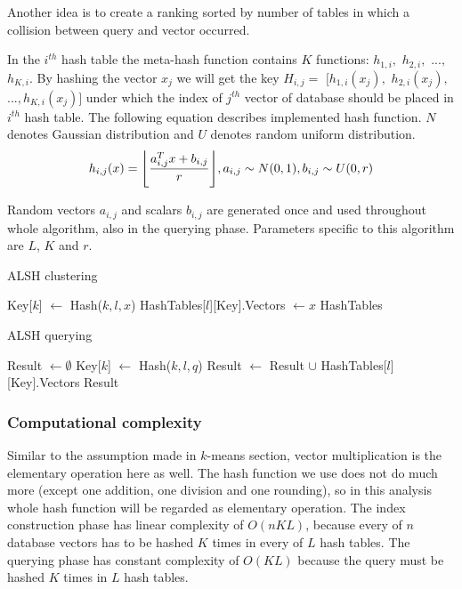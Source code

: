 Another idea is to create a ranking sorted by number of tables in which a collision
between query and vector occurred.
\par
In the $i^{th}$ hash table the meta-hash function contains $K$ functions: $h_{1,i},$ $h_{2,i},$ $...,$ $h_{K,i}$.
By hashing the vector $x_j$ we will get the key $H_{i,j} = $ $[h_{1,i}(x_j),$ $h_{2,i}(x_j),$
$..., h_{K,i}(x_j)]$ under which the index of $j^{th}$ vector of database should be
placed in $i^{th}$ hash table. The following equation describes implemented hash function.
$N$ denotes Gaussian distribution and $U$ denotes random uniform distribution.
\begin{equation*}
h_{i,j}(x) = \floor*{\frac{a_{i,j}^T x + b_{i,j}}{r}}, a_{i,j} \sim N(0,1), b_{i,j} \sim U(0,r)
\end{equation*}
\par
Random vectors $a_{i,j}$ and scalars $b_{i,j}$ are generated once and used throughout whole
algorithm, also in the querying phase. Parameters specific to this algorithm are $L$, $K$ and $r$.

\begin{algorithm}
	\caption{ALSH clustering}
	\begin{algorithmic}
				\State Key[$k$] $\gets$ Hash($k, l, x$)
			\EndFor
			\State HashTables[$l$][Key].Vectors $\gets x$
		\EndFor
		\State \Return HashTables
	\end{algorithmic}
\end{algorithm}

\begin{algorithm}
	\caption{ALSH querying}
	\begin{algorithmic}
		\State Result $\gets \emptyset$
		\For{$l = 0, 1, ..., L$}
			\For{$k = 0, 1, ..., K$}
				\State Key[$k$] $\gets$ Hash($k, l, q$)
			\EndFor
			\State Result $\gets$ Result $\cup$ HashTables[$l$][Key].Vectors
		\EndFor
		\State \Return Result
	\end{algorithmic}
\end{algorithm}

\subsubsection*{Computational complexity}
Similar to the assumption made in $k$-means section, vector multiplication is the elementary operation here as well.
The hash function we use does not do much more (except one addition, one division and one rounding),
so in this analysis whole hash function will be regarded as elementary operation.
The index construction phase has linear complexity of $O(nKL)$, because every of $n$ database vectors
has to be hashed $K$ times in every of $L$ hash tables.
The querying phase has constant complexity of $O(KL)$ because the query must be hashed $K$ times in $L$ hash tables.


